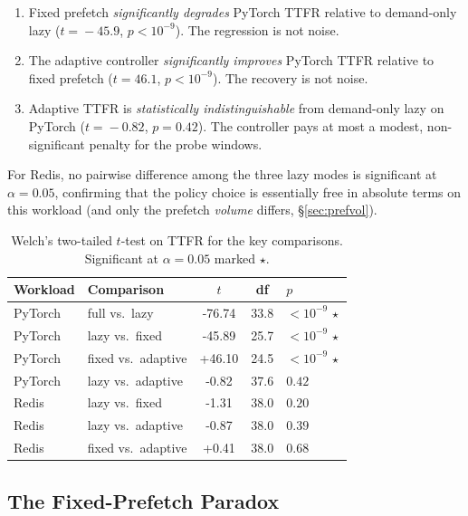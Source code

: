 \documentclass[journal]{IEEEtran}
\begin{document}
\begin{enumerate}
\item Fixed prefetch \emph{significantly degrades} PyTorch TTFR relative to
demand-only lazy ($t\!=\!-45.9$, $p\!<\!10^{-9}$). The regression is not
noise.
\item The adaptive controller \emph{significantly improves} PyTorch TTFR
relative to fixed prefetch ($t\!=\!46.1$, $p\!<\!10^{-9}$). The recovery is
not noise.
\item Adaptive TTFR is \emph{statistically indistinguishable} from
demand-only lazy on PyTorch ($t\!=\!-0.82$, $p\!=\!0.42$). The controller
pays at most a modest, non-significant penalty for the probe windows.
\end{enumerate}

For Redis, no pairwise difference among the three lazy modes is significant
at $\alpha\!=\!0.05$, confirming that the policy choice is essentially
free in absolute terms on this workload (and only the prefetch \emph{volume}
differs, \S\ref{sec:prefvol}).

\begin{table}[t]
\centering
\caption{Welch's two-tailed $t$-test on TTFR for the key comparisons.
Significant at $\alpha\!=\!0.05$ marked $\star$.}
\label{tab:ttest}
\renewcommand{\arraystretch}{1.15}
\setlength{\tabcolsep}{4pt}
\small
\begin{tabular}{l l S[table-format=+2.2] S[table-format=2.1] l}
\toprule
Workload & Comparison & {$t$} & {df} & {$p$} \\
\midrule
PyTorch  & full vs.\ lazy            & -76.74 & 33.8 & ${<}10^{-9}\,\star$ \\
PyTorch  & lazy vs.\ fixed           & -45.89 & 25.7 & ${<}10^{-9}\,\star$ \\
PyTorch  & fixed vs.\ adaptive       & +46.10 & 24.5 & ${<}10^{-9}\,\star$ \\
PyTorch  & lazy vs.\ adaptive        &  -0.82 & 37.6 & $0.42$              \\
Redis    & lazy vs.\ fixed           &  -1.31 & 38.0 & $0.20$              \\
Redis    & lazy vs.\ adaptive        &  -0.87 & 38.0 & $0.39$              \\
Redis    & fixed vs.\ adaptive       &  +0.41 & 38.0 & $0.68$              \\
\bottomrule
\end{tabular}
\end{table}

\subsection{The Fixed-Prefetch Paradox}
\label{sec:paradox}
\end{document}
